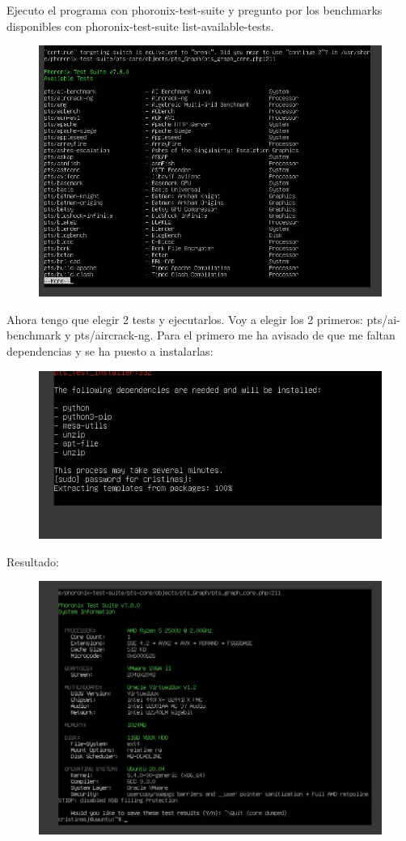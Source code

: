 Ejecuto el programa con phoronix-test-suite y pregunto por los benchmarks disponibles con phoronix-test-suite list-available-tests.  
\begin{figure}[H]
\centering
\includegraphics{availabletests.jpg}
\end{figure} 
Ahora tengo que elegir 2 tests y ejecutarlos. Voy a elegir los 2 primeros: pts/ai-benchmark y pts/aircrack-ng. 
Para el primero me ha avisado de que me faltan dependencias y se ha puesto a instalarlas: 
\begin{figure}[H]
\centering
\includegraphics{deviam.jpg}
\end{figure}
Resultado: 
\begin{figure}[H]
\centering
\includegraphics{resultado.jpg}
\end{figure}
